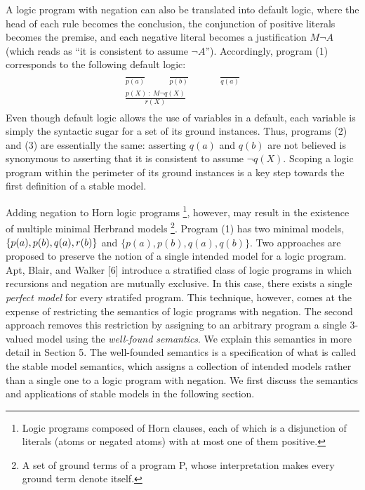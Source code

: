 A logic program with negation can also be translated into default logic, where the head 
of each rule becomes the conclusion, the conjunction of positive literals becomes the premise, 
and each negative literal becomes a justification $M \neg A$ (which reads as ``it is consistent to assume $\neg A$''). 
Accordingly, program (1) corresponds to the following default logic:
\begin{align}
    \begin{split}
        \frac{}{p(a)} \hspace{1cm} \frac{}{p(b)} \hspace{1cm} &\frac{}{q(a)} \\ 
        \frac{p(X) \: : \: M \neg q(X)}{r(X)}&
    \end{split}
\end{align}
Even though default logic allows the use of variables in a default, each variable is simply 
the syntactic sugar for a set of its ground instances. Thus, programs (2) and (3) are essentially 
the same: asserting $q(a)$ and $q(b)$ are not believed is synonymous to asserting that it is consistent to assume 
$\neg q(X)$. Scoping a logic program within the perimeter of its ground instances is a key step 
towards the first definition of a stable model. 

Adding negation to Horn logic programs \footnote{Logic programs composed of Horn clauses, 
each of which is a disjunction of literals (atoms or negated atoms) with at most one of 
them positive.}, however, may result in the existence of multiple minimal 
Herbrand models \footnote{A set of ground terms of a program P, whose interpretation 
makes every ground term denote itself.}. 
Program (1) has two minimal models, $\{p(a),p(b),\\q(a),r(b)\}$ and $\{p(a),p(b),q(a),q(b)\}$.
Two approaches are proposed to preserve the notion of a single intended model for a logic program. 
Apt, Blair, and Walker [6] introduce a stratified class of logic programs in which recursions and negation are 
mutually exclusive. In this case, there exists a single \emph{perfect model} for every stratifed program. 
This technique, however, comes at the expense of restricting the semantics of logic programs with negation. 
The second approach removes this restriction by assigning to an arbitrary program a single 3-valued 
model using the \emph{well-found semantics}. We explain this semantics in more detail in Section 5. The 
well-founded semantics is a specification of what is called the stable model semantics, which 
assigns a collection of intended models rather than a single one to a logic program with negation. 
We first discuss the semantics and applications of stable models in the following section. 